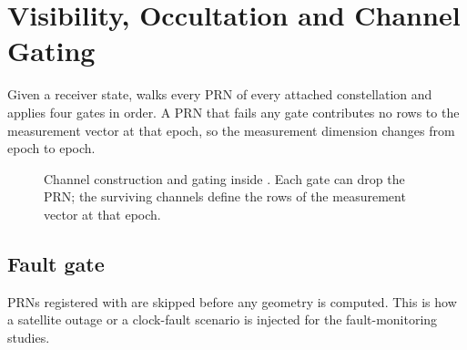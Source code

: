 \section{Visibility, Occultation and Channel Gating}
\label{sec:gnss-visibility}

Given a receiver state,  walks every PRN of every attached
constellation and applies four gates in order. A PRN that fails any gate
contributes no rows to the measurement vector at that epoch, so the
measurement dimension changes from epoch to epoch.

\begin{figure}[htbp]
  \centering
  \caption{Channel construction and gating inside
    . Each gate can drop the PRN; the
    surviving channels define the rows of the measurement vector at that
    epoch.}
  \label{fig:gnss-pipeline}
\end{figure}

\subsection{Fault gate}

PRNs registered with  are skipped before any geometry is
computed. This is how a satellite outage or a clock-fault scenario is injected
for the fault-monitoring studies.

